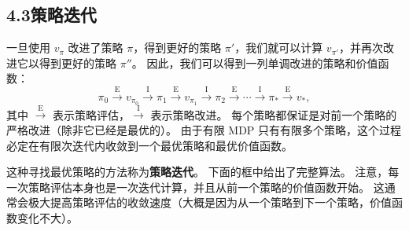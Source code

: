 \documentclass[UTF8, 12pt, fontset=fandol, oneside]{ctexart}
\begin{document}
\subsection*{4.3\quad 策略迭代}

一旦使用 $v_\pi$ 改进了策略 $\pi$，得到更好的策略 $\pi'$，我们就可以计算 $v_{\pi'}$，并再次改进它以得到更好的策略 $\pi''$。
因此，我们可以得到一列单调改进的策略和价值函数：
\[
\pi_0 \xrightarrow{\mathrm{E}} v_{\pi_0} \xrightarrow{\mathrm{I}} \pi_1
\xrightarrow{\mathrm{E}} v_{\pi_1} \xrightarrow{\mathrm{I}} \pi_2
\xrightarrow{\mathrm{E}} \cdots \xrightarrow{\mathrm{I}} \pi_*
\xrightarrow{\mathrm{E}} v_* ,
\]
其中 $\xrightarrow{\mathrm{E}}$ 表示策略评估，$\xrightarrow{\mathrm{I}}$ 表示策略改进。
每个策略都保证是对前一个策略的严格改进（除非它已经是最优的）。
由于有限 MDP 只有有限多个策略，这个过程必定在有限次迭代内收敛到一个最优策略和最优价值函数。

这种寻找最优策略的方法称为\textbf{策略迭代}。
下面的框中给出了完整算法。
注意，每一次策略评估本身也是一次迭代计算，并且从前一个策略的价值函数开始。
这通常会极大提高策略评估的收敛速度（大概是因为从一个策略到下一个策略，价值函数变化不大）。

\begin{center}
\end{center}
\end{document}
